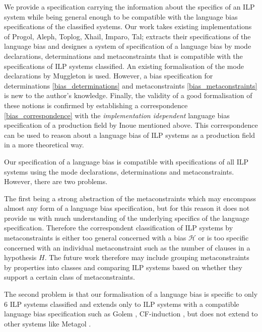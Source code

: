 We provide a specification carrying the information about the specifics of an ILP system while being general enough to be compatible with the language bias specifications of the classified systems.
Our work takes existing implementations of Progol, Aleph, Toplog, Xhail, Imparo, Tal; extracts their specifications of the language bias and designes a system of specification of a language bias by mode declarations, determinations and metaconstraints that is compatible with the specifications of ILP systems classified. An existing formalisation of the mode declarations by Muggleton \cite{muggleton1995inverse} is used. However, a bias specification for determinations \ref{bias_determinations} and metaconstraints \ref{bias_metaconstraints} is new to the author's knowledge. Finally, the validity of a good formalisation of these notions is confirmed by establishing a correspondence \ref{bias_correspondence} with the \emph{implementation idependent} language bias specification of a production field by Inoue \cite{inoue1992linear} mentioned above. This correspondence can be used to reason about a language bias of ILP systems as a production field in a more theoretical way.

Our specification of a language bias is compatible with specifications of all ILP systems using the mode declarations, determinations and metaconstraints. However, there are two problems.

The first being a strong abstraction of the metaconstraints which may encompass almost any form of a language bias specification, but for this reason it does not provide us with much understanding of the underlying specifics of the language specification. Therefore the correspondent classification of ILP systems by metaconstraints is either too general concerned with a bias $\mathcal{H}$ or is too specific concerned with an individual metaconstraint such as the number of clauses in a hypothesis $H$. The future work therefore may include grouping metaconstraints by properties into classes and comparing ILP systems based on whether they support a certain class of metaconstraints.

The second problem is that our formalisation of a language bias is specific to only 6 ILP systems classified and extends only to ILP systems with a compatible language bias specification such as Golem \cite{muggleton1992efficient}, CF-induction \cite{yamamoto2014cfInductionWebsite}, but does not extend to other systems like Metagol \cite{muggleton2013meta}\cite{muggleton2014meta}.

